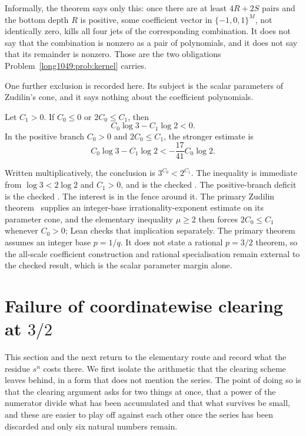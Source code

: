 Informally, the theorem says only this: once there are at least \(4R+2S\) pairs
and the bottom depth \(R\) is positive, some coefficient vector in
\(\{-1,0,1\}^M\), not identically zero, kills all four jets of the
corresponding combination.  It does not say that the combination is nonzero as
a pair of polynomials, and it does not say that its remainder is nonzero.  Those
are the two obligations Problem~\ref{long1049:prob:kernel} carries.

One further exclusion is recorded here.  Its subject is the scalar parameters
of Zudilin's cone, and it says nothing about the coefficient polynomials.

\begin{theorem}\label{long1049:res:scalar}
Let \(C_1>0\).  If \(C_0\le0\) or \(2C_0\le C_1\), then
\[
 C_0\log 3-C_1\log 2<0.
\]
In the positive branch $C_0>0$ and $2C_0\le C_1$, the stronger estimate is
\[
 C_0\log3-C_1\log2< -\frac{17}{41}C_0\log2.
\]
\end{theorem}

\noindent Written multiplicatively, the conclusion is \(3^{C_0}<2^{C_1}\).  The
inequality is immediate from \(\log3<2\log2\) and \(C_1>0\), and
is the checked
.  The positive-branch deficit is the checked
.
The interest is in the fence around it.  The primary Zudilin
theorem~\cite[Theorem~1, p.~154; Sec.~5, pp.~161--162]{zudilin2004} supplies an integer-base
irrationality-exponent estimate on its parameter cone, and the elementary
inequality \(\mu\ge2\) then forces \(2C_0\le C_1\) whenever \(C_0>0\); Lean
checks that implication separately.  The primary theorem assumes an integer
base \(p=1/q\).  It does not state a rational \(p=3/2\) theorem, so the
all-scale coefficient construction and rational specialisation remain
external to the checked result, which is the scalar parameter margin alone.

\section{Failure of coordinatewise clearing at $3/2$}\label{long1049:sec:corridor}

This section and the next return to the elementary route and record what the
residue $s^{n}$ costs there.  We first isolate the arithmetic that the clearing
scheme leaves behind, in a form that does not mention the series.  The point of
doing so is that the clearing argument asks for two things at once, that a
power of the numerator divide what has been accumulated and that what survives
be small, and these are easier to play off against each other once the series
has been discarded and only six natural numbers remain.

